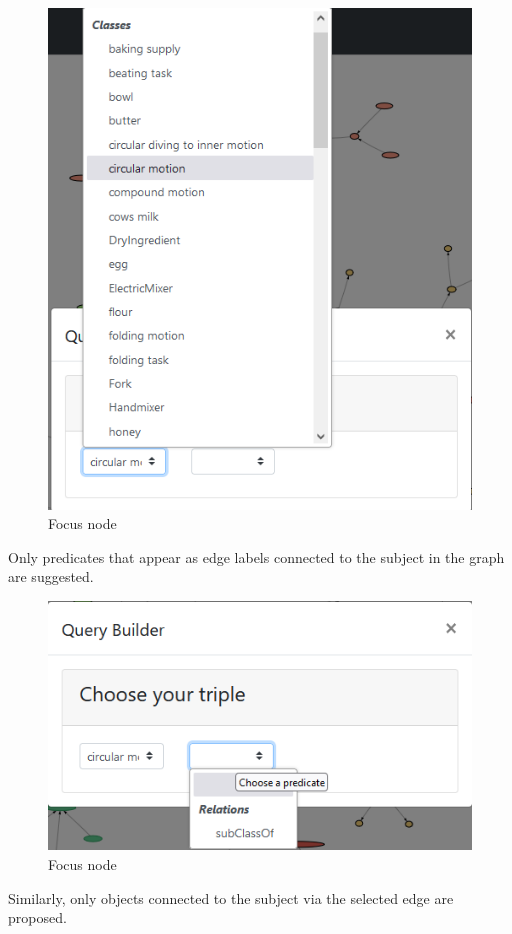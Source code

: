 \begin{figure}[H]
    \includegraphics[scale=0.4]{Graphics/OwlVisualizer/queryBuilder1.png}
    \centering
    \caption{Focus node}
\end{figure}

Only predicates that appear as edge labels connected to the subject in the graph are suggested. 

\begin{figure}[H]
    \includegraphics[scale=0.4]{Graphics/OwlVisualizer/queryBuilder2.png}
    \centering
    \caption{Focus node}
\end{figure}
Similarly, only objects connected to the subject via the selected edge are proposed. 

